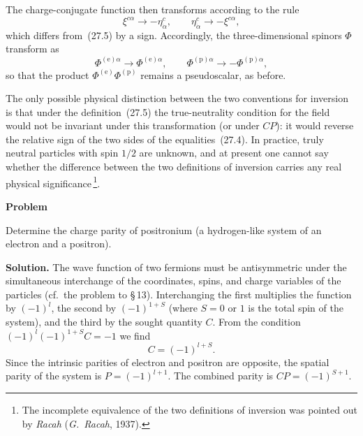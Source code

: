 The charge-conjugate function then transforms according to the rule
\[
\xi^{c\alpha} \to -\eta^c_{\dot\alpha},\qquad \eta^c_{\dot\alpha} \to -\xi^{c\alpha},
\]
which differs from~(27.5) by a sign. Accordingly, the three-dimensional spinors $\Phi$ transform as
\[
\Phi^{(\text{e})\alpha} \to \Phi^{(\text{e})\alpha},\qquad \Phi^{(\text{p})\alpha} \to -\Phi^{(\text{p})\alpha},
\]
so that the product $\Phi^{(\text{e})}\Phi^{(\text{p})}$ remains a pseudoscalar, as before.

The only possible physical distinction between the two conventions for inversion is that under the definition~(27.5) the true-neutrality condition for the field would not be invariant under this transformation (or under $CP$): it would reverse the relative sign of the two sides of the equalities~(27.4). In practice, truly neutral particles with spin $1/2$ are unknown, and at present one cannot say whether the difference between the two definitions of inversion carries any real physical significance\,\footnote{The incomplete equivalence of the two definitions of inversion was pointed out by \emph{Racah} (\emph{G.~Racah}, 1937).}.

\begin{center}
\textbf{Problem}
\end{center}

Determine the charge parity of positronium (a hydrogen-like system of an electron and a positron).

\textbf{Solution.} The wave function of two fermions must be antisymmetric under the simultaneous interchange of the coordinates, spins, and charge variables of the particles (cf.\ the problem to \S\,13). Interchanging the first multiplies the function by $(-1)^l$, the second by $(-1)^{1+S}$ (where $S = 0$ or $1$ is the total spin of the system), and the third by the sought quantity $C$. From the condition $(-1)^l(-1)^{1+S}C = -1$ we find
\[
C = (-1)^{l+S}.
\]
Since the intrinsic parities of electron and positron are opposite, the spatial parity of the system is $P = (-1)^{l+1}$. The combined parity is $CP = (-1)^{S+1}$.
